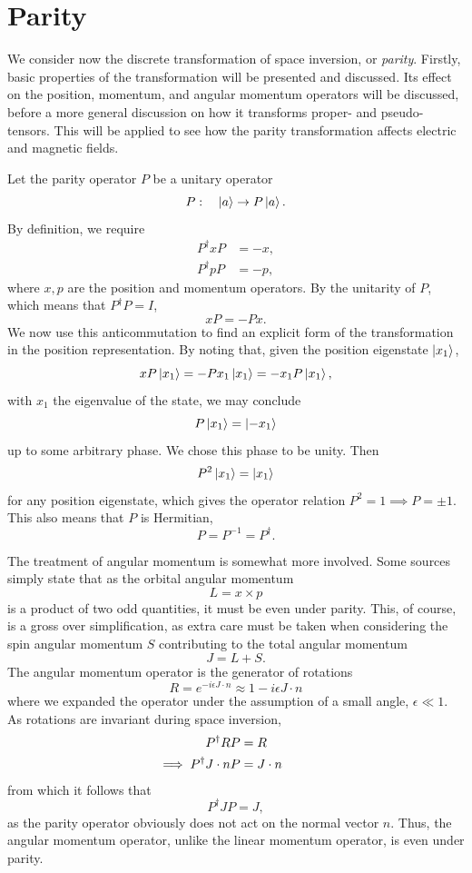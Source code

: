 \section{Parity}
We consider now the discrete transformation of space inversion, or \emph{parity}.
Firstly, basic properties of the transformation will be presented and discussed.
Its effect on the position, momentum, and angular momentum operators will be discussed, before a more general discussion on how it transforms proper- and pseudo-tensors.
This will be applied to see how the parity transformation affects electric and magnetic fields.

Let the parity operator $P$ be a unitary operator
\begin{equation}
  P: \quad \ket{a} \rightarrow P\ket{a}.
\end{equation}
By definition, we require
\begin{align}
  P^\dagger x P &= -x,\\
  P^\dagger p P &= -p,
\end{align}
where $x, p$ are the position and momentum operators.
By the unitarity of $P$, which means that $P^\dagger P = I$,
$$
xP = -Px.
$$
We now use this anticommutation to find an explicit form of the transformation in the position representation.
By noting that, given the position eigenstate $\ket{x_1}$,
\begin{equation}
  x P\ket{x_1} = -P x_1\ket{x_1} = -x_1 P\ket{x_1},
\end{equation}
with $x_1$ the eigenvalue of the state, we may conclude
$$
P\ket{x_1} = \ket{-x_1}
$$
up to some arbitrary phase.
We chose this phase to be unity.
Then
\begin{equation}
  P^2 \ket{x_1} = \ket{x_1}
\end{equation}
for any position eigenstate, which  gives the  operator relation $P^2 = 1 \implies P = \pm 1$.
This also means that $P$ is Hermitian,
$$
P = P^{-1} = P^\dagger.
$$

The treatment of angular momentum is somewhat more involved.
Some sources simply state that as the orbital angular momentum
$$
L = x \times p
$$
is a product of two odd quantities, it must be even under parity.
This, of course, is a gross over simplification, as extra care must be taken when considering the spin angular momentum $S$ contributing to the total angular momentum
$$
J = L + S.
$$
The angular momentum operator is the generator of rotations
$$
R = e^{-i \epsilon J\cdot n} \approx 1 - i \epsilon J \cdot n
$$
where we expanded the operator under the assumption of a small angle, $\epsilon \ll 1$.
As rotations are invariant during space inversion,
\begin{align}
  P^\dagger R P &= R\\
 \mathllap{\implies\;} P^\dagger J \cdot n P &= J\cdot n
\end{align}
from which it follows that
\begin{equation}
P^\dagger J P = J,
\end{equation}
as the parity operator obviously does not act on the normal vector $n$.
Thus, the angular momentum operator, unlike the linear momentum operator, is even under parity.

